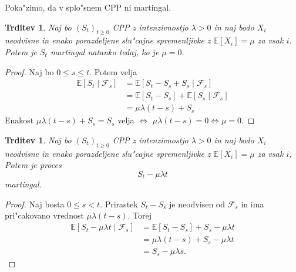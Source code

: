 \documentclass[12pt,a4paper]{amsart}
\theoremstyle{definition} %
\theoremstyle{plain} %
\newtheorem{trditev}[definicija]{Trditev}
\newcommand{\E}{\mathbb{E}}
\newcommand{\F}{\mathcal{F}}
\newcommand{\1}{\mathds{1}}
\begin{document}
        Poka"zimo, da v splo"snem CPP ni martingal.

        \begin{trditev}
            Naj bo $(S_t)_{t\geq0}$ CPP z intenzivnostjo $\lambda>0$ in naj bodo $X_i$ neodvisne
            in enako porazdeljene slu"cajne spremenljivke z $\E\left[X_i\right] = \mu$ za vsak $i$.
            Potem je $S_t$ martingal natanko tedaj, ko je $\mu = 0$.
            \label{trd:CPPnimartingal}
        \end{trditev}

        \begin{proof}
            Naj bo $0\leq s\leq t$. Potem velja
            \begin{align*}
                \E\left[S_t\mid\F_s\right] 
                        &= \E\left[S_t - S_s + S_s\mid \F_s\right] \\
                        &= \E\left[S_t - S_s\right] + \E\left[S_s\mid \F_s\right] \\
                        &= \mu\lambda(t-s) + S_s
            \end{align*}
           Enakost $\mu\lambda(t-s) + S_s = S_s$ velja $\iff$ $\mu\lambda(t-s) = 0 \iff \mu = 0$.
        \end{proof}


        \begin{trditev}
            Naj bo $(S_t)_{t\geq0}$ CPP z intenzivnostjo $\lambda > 0$ in naj bodo $X_i$ neodvisne
            in enako porazdeljene slu"cajne spremenljivke z $\E\left[X_i\right] = \mu$ za vsak $i$,
            Potem je proces 
            $$
                S_t - \mu\lambda t
            $$
            martingal.
            \label{trd:CPPpostanemartingal}
        \end{trditev}

        \begin{proof}
            Naj bosta $0 \leq s < t$. Prirastek $S_t - S_s$ je neodvisen od $\F_s$ in ima 
            pri"cakovano vrednost $\mu\lambda(t-s)$. Torej 
            \begin{align*}
                \E\left[S_t - \mu\lambda t\mid\F_s\right] 
                        &= \E\left[S_t - S_s\right] + S_s - \mu\lambda t\\
                        &= \mu\lambda(t-s) + S_s - \mu\lambda t\\
                        &= S_s - \mu\lambda s.
            \end{align*}
        \end{proof}
\end{document}
